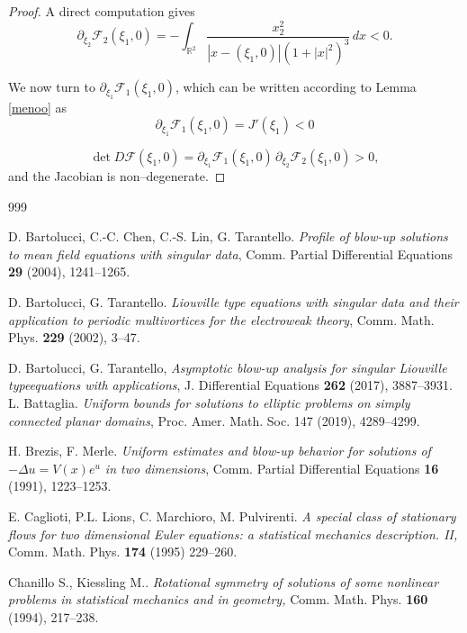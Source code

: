 \documentclass[reqno,11pt]{amsart}
\theoremstyle{definition}
\numberwithin{equation}{section}
\renewcommand{\(}{\left(}
\renewcommand{\)}{\right)}
\renewcommand{\[}{\left[}
\renewcommand{\]}{\right]}
\begin{document}
{\begin{proof}
A direct computation gives
$$
\partial_{\xi_2}\mathcal F_2(\xi_1,0)
=-
\int_{\mathbb R^2}
\frac{x_2^2}{|x-(\xi_1,0)|(1+|x|^2)^3}\,dx <0.
$$

We now turn to $\partial_{\xi_1}\mathcal F_1(\xi_1,0)$, which can be written according to Lemma \ref{menoo} as
$$
\partial_{\xi_1}\mathcal F_1(\xi_1,0)
=J'(\xi_1)<0
$$



$$
\det D\mathcal F(\xi_1,0)
=
\partial_{\xi_1}\mathcal F_1(\xi_1,0)\,
\partial_{\xi_2}\mathcal F_2(\xi_1,0)
>0 ,
$$
and the Jacobian is non–degenerate.
\end{proof}









\begin{thebibliography}{999}



 D. Bartolucci, C.-C. Chen, C.-S. Lin, G. Tarantello. {\em Profile of blow-up solutions to mean field equations with singular data}, Comm. Partial Differential Equations {\bf 29} (2004),  1241--1265.


 D. Bartolucci, G. Tarantello. {\em  Liouville type equations with singular data and their application to periodic multivortices for the electroweak theory}, Comm. Math. Phys. {\bf 229} (2002), 3--47.

 D. Bartolucci, G. Tarantello, {\em Asymptotic   blow-up   analysis   for   singular   Liouville   typeequations   with   applications}, J. Differential Equations {\bf 262} (2017), 3887--3931.
 L. Battaglia. {\em Uniform bounds for solutions to elliptic problems on simply connected planar
domains}, Proc. Amer. Math. Soc. 147 (2019),  4289--4299.

 H. Brezis, F. Merle. {\em Uniform estimates and blow-up behavior for solutions of $-\Delta u = V (x)e^u$ in two dimensions},  Comm. Partial Differential Equations {\bf 16} (1991),  1223--1253.


  E. Caglioti, P.L. Lions, C. Marchioro, M. Pulvirenti. {\em A special class of stationary flows for two dimensional Euler
equations: a statistical mechanics description. II,} Comm. Math. Phys. {\bf 174} (1995) 229--260.

 Chanillo S., Kiessling M.. {\em Rotational symmetry of solutions of some nonlinear problems in statistical mechanics and in geometry,} Comm. Math. Phys. {\bf 160} (1994),
217--238.



\end{thebibliography}}
\end{document}
